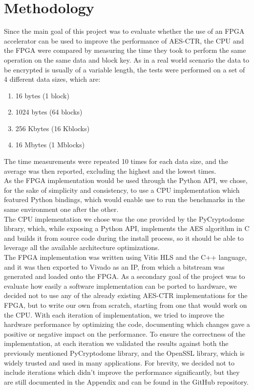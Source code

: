 \documentclass[12pt,oneside,a4paper]{article}
\begin{document}
\section{Methodology} \label{sec:methodology}
Since the main goal of this project was to evaluate whether the use of an FPGA accelerator can be used to improve the performance of AES-CTR, the CPU and the FPGA were compared by measuring the time they took to perform the same operation on the same data and block key.
As in a real world scenario the data to be encrypted is usually of a variable length, the tests were performed on a set of 4 different data sizes, which are:
\begin{enumerate}
	\item 16 bytes (1 block)
	\item 1024 bytes (64 blocks)
	\item 256 Kbytes (16 Kblocks)
	\item 16 Mbytes (1 Mblocks)
\end{enumerate}
The time measurements were repeated 10 times for each data size, and the average was then reported, excluding the highest and the lowest times.
\\As the FPGA implementation would be used through the Python API, we chose, for the sake of simplicity and consistency, to use a CPU implementation which featured Python bindings, which would enable use to run the benchmarks in the same environment one after the other.
\\The CPU implementation we chose was the one provided by the PyCryptodome library, which, while exposing a Python API, implements the AES algorithm in C and builds it from source code during the install process, so it should be able to leverage all the available architecture optimizations.
\\The FPGA implementation was written using Vitis HLS and the C++ language, and it was then exported to Vivado as an IP, from which a bitstream was generated and loaded onto the FPGA.
As a secondary goal of the project was to evaluate how easily a software implementation can be ported to hardware, we decided not to use any of the already existing AES-CTR implementations for the FPGA, but to write our own from scratch, starting from one that would work on the CPU.
With each iteration of implementation, we tried to improve the hardware performance by optimizing the code, documenting which changes gave a positive or negative impact on the performance.
To ensure the correctness of the implementation, at each iteration we validated the results against both the previously mentioned PyCryptodome library, and the OpenSSL library, which is widely trusted and used in many applications.
For brevity, we decided not to include iterations which didn't improve the performance significantly, but they are still documented in the Appendix and can be found in the GitHub repository.
\end{document}
